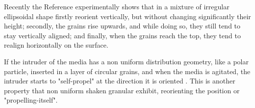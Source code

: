     Recently the Reference \cite{Size_segregation_of_irregular_granular_materials_captured_by_time-resolved_3D_imaging} experimentally shows that in a mixture of irregular ellipsoidal shape firstly reorient vertically, but without changing significantly their height; secondly, the grains rise upwards, and while doing so, they still tend to stay vertically aligned; and finally, when the grains reach the top, they tend to realign horizontally on the surface.

    If the intruder of the media has a non uniform distribution geometry, like a polar particle, inserted in a layer of circular grains, and when the media is agitated, the intruder starts to "self-propel" at the direction it is oriented \cite{Symmetry_properties_of_the_large-deviation_function_of_the_velocity_of_a_self-propelled_polar_particle}. This is another property that non uniform shaken granular exhibit, reorienting the position or "propelling-itself".



